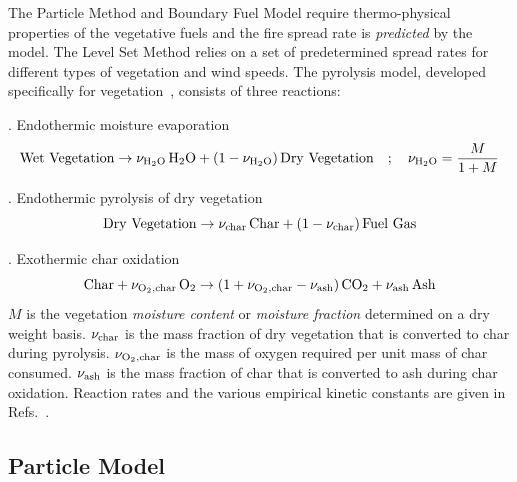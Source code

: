 \documentclass[journal,article,atmosphere,submit,moreauthors,pdftex]{Definitions/mdpi}
\begin{document}
The Particle Method and Boundary Fuel Model require thermo-physical properties of the vegetative fuels and the fire spread rate is {\em predicted} by the model. The Level Set Method relies on a set of predetermined spread rates for different types of vegetation and wind speeds. The pyrolysis model, developed specifically for vegetation~\cite{Porterie:2006,Morvan:CF2004,Houssami:2016}, consists of three reactions:

\vspace{\baselineskip}

. Endothermic moisture evaporation
\begin{equation}
 {\rm Wet\ Vegetation} \rightarrow \nu_{\rm H_2O} \, {\rm H_2O} + (1-\nu_{\rm H_2O}) \, {\rm Dry\ Vegetation} \quad ; \quad \nu_{\rm H_2O} = \frac{M}{1+M}
\end{equation}

. Endothermic pyrolysis of dry vegetation
\begin{equation}
 {\rm Dry\ Vegetation} \rightarrow \nu_{\rm char} \, {\rm Char} + (1-\nu_{\rm char}) \, {\rm Fuel\ Gas}
\end{equation}

. Exothermic char oxidation
\begin{equation}
 \label{char_reaction}
 {\rm Char} + \nu_{\rm O_2, char} \, {\rm O_2} \rightarrow (1+ \nu_{\rm O_2,char} - \nu_{\rm ash}) \, {\rm CO_2} + \nu_{\rm ash} \, {\rm Ash}
\end{equation}
$M$ is the vegetation {\em moisture content} or {\em moisture fraction} determined on a dry weight basis. $\nu_{\rm char}$ is the mass fraction of dry vegetation that is converted to char during pyrolysis.   $\nu_{\rm O_2,char}$ is the mass of oxygen required per unit mass of char consumed. $\nu_{\rm ash}$  is the mass fraction of char that is converted to ash during char oxidation. Reaction rates and the various empirical kinetic constants are given in Refs.~\cite{Porterie:2006,Morvan:CF2004,Houssami:2016}.

\subsection{Particle Model}
\label{particle_model}
\end{document}
